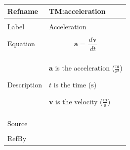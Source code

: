 \documentclass[12pt]{article}
\begin{document}
\vspace{\baselineskip}
\noindent
\begin{minipage}{\textwidth}
\begin{tabular}{>{\raggedright}p{}>{\raggedright\arraybackslash}p{}}
\toprule \textbf{Refname} & \textbf{TM:acceleration}
\label{TM:acceleration}
\\ \midrule \\
Label & Acceleration
        
\\ \midrule \\
Equation & \begin{displaymath}
           \symbf{a}=\frac{\,d\symbf{v}}{\,dt}
           \end{displaymath}
\\ \midrule \\
Description & \begin{symbDescription}
              \item{$\symbf{a}$ is the acceleration ($\frac{\text{m}}{\text{s}^{2}}$)}
              \item{$t$ is the time (${\text{s}}$)}
              \item{$\symbf{v}$ is the velocity ($\frac{\text{m}}{\text{s}}$)}
              \end{symbDescription}
\\ \midrule \\
Source & \cite{accelerationWiki}
         
\\ \midrule \\
RefBy & 
\\ \bottomrule
\end{tabular}
\end{minipage}
\vspace{\baselineskip}
\noindent
\end{document}
